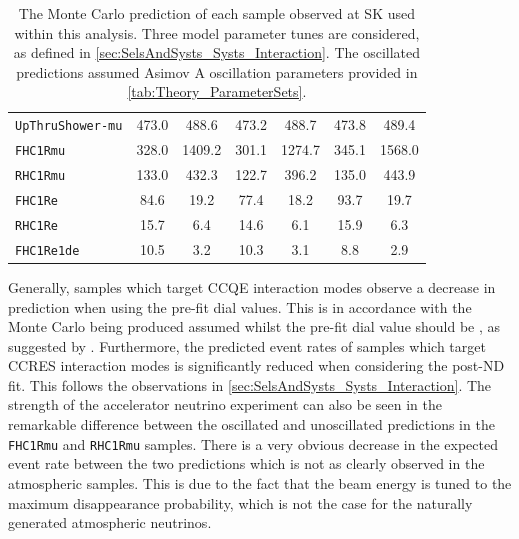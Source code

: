 \begin{table}[ht!]
\begin{tabular}{|l|c|c|c|c|c|c|}
      \texttt{UpThruShower-mu} & 473.0 & 488.6 & 473.2 & 488.7 & 473.8 & 489.4 \\
      \texttt{FHC1Rmu} & 328.0 & 1409.2 & 301.1 & 1274.7 & 345.1 & 1568.0 \\
      \texttt{RHC1Rmu} & 133.0 & 432.3 & 122.7 & 396.2 & 135.0 & 443.9 \\
      \texttt{FHC1Re} & 84.6 & 19.2 & 77.4 & 18.2 & 93.7 & 19.7 \\
      \texttt{RHC1Re} & 15.7 & 6.4 & 14.6 & 6.1 & 15.9 & 6.3 \\
      \texttt{FHC1Re1de} & 10.5 & 3.2 & 10.3 & 3.1 & 8.8 & 2.9 \\
      \hline
      \hline
    \end{tabular}
    \caption{The Monte Carlo prediction of each sample observed at SK used within this analysis. Three model parameter tunes are considered, as defined in \autoref{sec:SelsAndSysts_Systs_Interaction}. The oscillated predictions assumed Asimov A oscillation parameters provided in \autoref{tab:Theory_ParameterSets}.}
    \label{tab:OscillationAnalysis_MCPred}
\end{table}

Generally, samples which target CCQE interaction modes observe a decrease in prediction when using the pre-fit dial values. This is in accordance with the Monte Carlo being produced assumed  whilst the pre-fit dial value should be , as suggested by \cite{t2k_tn_344}. Furthermore, the predicted event rates of samples which target CCRES interaction modes is significantly reduced when considering the post-ND fit. This follows the observations in \autoref{sec:SelsAndSysts_Systs_Interaction}. The strength of the accelerator neutrino experiment can also be seen in the remarkable difference between the oscillated and unoscillated predictions in the \texttt{FHC1Rmu} and \texttt{RHC1Rmu} samples. There is a very obvious decrease in the expected event rate between the two predictions which is not as clearly observed in the atmospheric samples. This is due to the fact that the beam energy is tuned to the maximum disappearance probability, which is not the case for the naturally generated atmospheric neutrinos.

